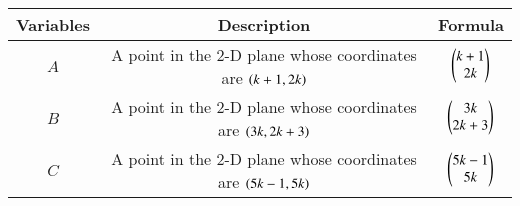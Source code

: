\begin{tabular}[12pt]{ |c| c| c|}
\hline
\textbf{Variables} & \textbf{Description} & \textbf{Formula} \\
\hline
$A$ & A point in the 2-D plane whose coordinates are $\left(k + 1, 2k\right)$ & $\begin{pmatrix}k + 1\\2k\end{pmatrix}$\\
\hline
$B$ & A point in the 2-D plane whose coordinates are $\left(3k, 2k + 3\right)$ & $\begin{pmatrix}3k\\2k + 3\end{pmatrix}$\\
\hline
$C$ & A point in the 2-D plane whose coordinates are $\left(5k - 1, 5k\right)$ & $\begin{pmatrix}5k - 1\\5k\end{pmatrix}$\\
\hline
\end{tabular}

